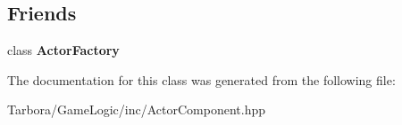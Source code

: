 \subsection*{Friends}
\begin{DoxyCompactItemize}
\item 
\mbox{\label{classTarbora_1_1ActorComponent_a6ab97c7737ba5ca6e4cb3a4621c48421}} 
class {\bfseries Actor\+Factory}
\end{DoxyCompactItemize}


The documentation for this class was generated from the following file\+:\begin{DoxyCompactItemize}
\item 
Tarbora/\+Game\+Logic/inc/Actor\+Component.\+hpp\end{DoxyCompactItemize}
